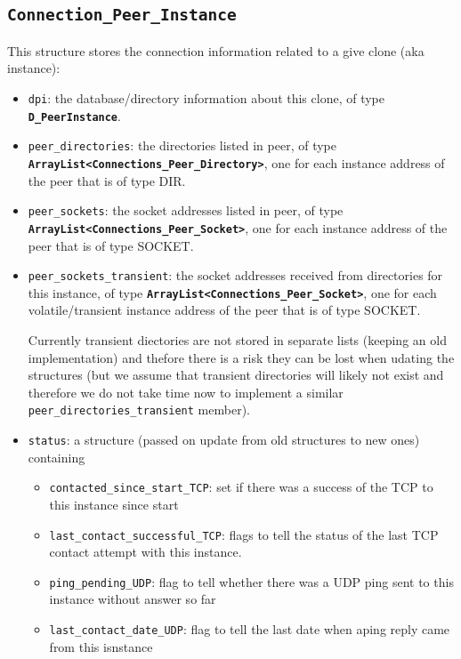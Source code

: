 \documentclass{book}
\newcommand{\cls}[1]{{\tt\bf #1}}
\newcommand{\mmb}[1]{{\tt #1}}
\begin{document}
\subsection{\cls{Connection\_Peer\_Instance}}
This structure stores the connection information related to a give clone (aka instance):
\begin{itemize}
\item
\mmb{dpi}: the database/directory information about this clone, of type \cls{D\_PeerInstance}.
\item
\mmb{peer\_directories}: the  directories listed in peer, of type \cls{ArrayList<Connections\_Peer\_Directory>}, one for each
instance address of the peer that is of type DIR.
\item
\mmb{peer\_sockets}: the socket addresses listed in peer, of type \cls{ArrayList<Connections\_Peer\_Socket>}, one for each
instance address of the peer that is of type SOCKET.
\item
\mmb{peer\_sockets\_transient}: the socket addresses received from directories for this instance, of type \cls{ArrayList<Connections\_Peer\_Socket>}, one for each volatile/transient
instance address of the peer that is of type SOCKET. 

Currently transient diectories are not stored in separate lists (keeping an old implementation) and thefore 
there is a risk they can be lost when udating the structures (but we assume that transient directories will likely not exist and therefore
we do not take time now to implement a similar \mmb{peer\_directories\_transient} member).
\item
\mmb{status}: a structure (passed on update from old structures to new ones)  containing
 \begin{itemize}
 \item
	\mmb{contacted\_since\_start\_TCP}: set if there was a success of the TCP to this instance since start
 \item
	 \mmb{last\_contact\_successful\_TCP}:
            flags to tell the status of the last TCP contact attempt with this instance.
 \item
 	\mmb{ping\_pending\_UDP}: flag to tell whether there was a UDP ping sent to this instance without answer so far
 \item
	\mmb{last\_contact\_date\_UDP}: flag to tell the last date when aping reply came from this isnstance
 \end{itemize}
\end{itemize}
\end{document}
